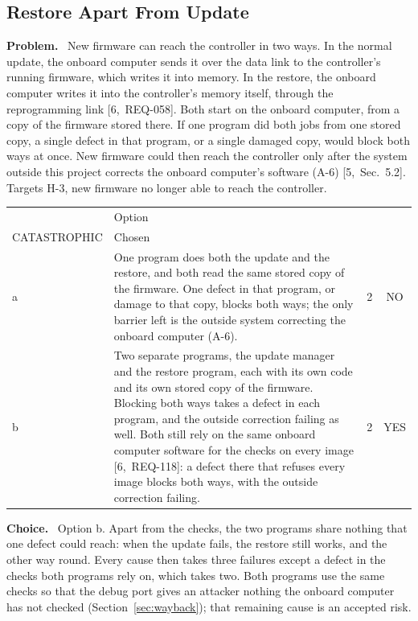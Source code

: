 \documentclass[11pt,a4paper]{article}
\makeatletter
\newcommand{\sev}[2]{\begin{tabular}[b]{@{}c@{}}#1\\{\scriptsize #2}\end{tabular}}
\newcommand{\field}[1]{\par\needspace{4\baselineskip}\smallskip\noindent\textbf{#1.}~}
\makeatother
\begin{document}
\subsection{Restore Apart From Update}
\label{sec:apart}
\field{Problem} New firmware can reach the controller in two ways. In the
normal update, the onboard computer sends it over the data link to the
controller's running firmware, which writes it into memory. In the restore,
the onboard computer writes it into the controller's memory itself, through the
reprogramming link [6,~REQ-058]. Both start on the onboard computer, from a
copy of the firmware stored there. If one program did both jobs from one stored
copy, a single defect in that program, or a single damaged copy, would block
both ways at once. New firmware could then reach the controller only after the
system outside this project corrects the onboard computer's software (A-6)
[5,~Sec.~5.2]. Targets H-3, new firmware no longer able to reach the
controller.

\smallskip
{\small\noindent\begin{tabularx}{\textwidth}{@{}l>{\raggedright\arraybackslash}Xcc@{}}
\toprule
 & Option & \sev{H-3}{CATASTROPHIC} & Chosen \\
\midrule
a & One program does both the update and the restore, and both read the same stored copy of the firmware. One defect in that program, or damage to that copy, blocks both ways; the only barrier left is the outside system correcting the onboard computer (A-6). & 2 & NO \\
b & Two separate programs, the update manager and the restore program, each with its own code and its own stored copy of the firmware. Blocking both ways takes a defect in each program, and the outside correction failing as well. Both still rely on the same onboard computer software for the checks on every image [6,~REQ-118]: a defect there that refuses every image blocks both ways, with the outside correction failing. & 2 & YES \\
\bottomrule
\end{tabularx}}


\field{Choice} Option b. Apart from the checks, the two programs share nothing
that one defect could reach: when the update fails, the restore still works,
and the other way round. Every cause then takes three failures except a defect
in the checks both programs rely on, which takes two. Both programs use the
same checks so that the debug port gives an attacker nothing the onboard
computer has not checked (Section~\ref{sec:wayback}); that remaining cause is
an accepted risk.
\end{document}
